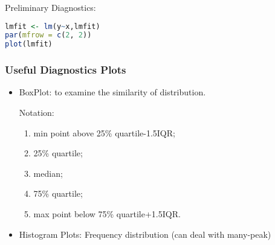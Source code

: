     \noindent Preliminary Diagnostics:

\begin{rcode}
\begin{lstlisting}[language=R]
lmfit <- lm(y~x,lmfit)
par(mfrow = c(2, 2))
plot(lmfit)
\end{lstlisting}
\end{rcode}
    

\subsubsection{Useful Diagnostics Plots}

        \begin{itemize}[topsep=2pt,itemsep=2pt]
            \item BoxPlot: to examine the similarity of  distribution.
            
            Notation:
            \begin{enumerate}[topsep=2pt,itemsep=2pt]
                \item min point above 25\% quartile-1.5IQR;
                \item 25\% quartile;
                \item median;
                \item 75\% quartile;
                \item max point below 75\% quartile+1.5IQR.
            \end{enumerate}
            
                
            \begin{center}
            \end{center}


    
            

        \item Histogram Plots: Frequency distribution (can deal with many-peak)
            

\end{itemize}
